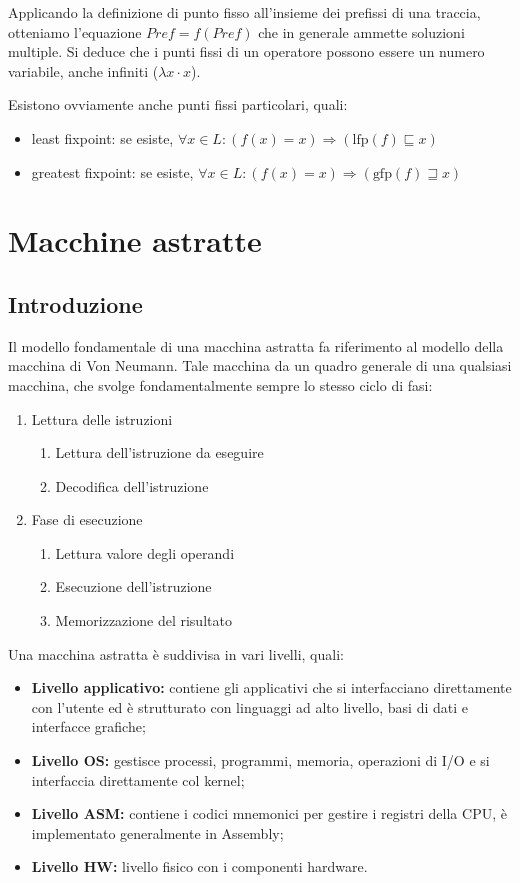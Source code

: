 \documentclass{article}[10pt]
\begin{document}
	Applicando la definizione di punto fisso all'insieme dei prefissi di una traccia, otteniamo l'equazione $Pref=f(Pref)$ che in generale ammette soluzioni multiple. Si deduce che i punti fissi di un operatore possono essere un numero variabile, anche infiniti ($\lambda x \cdot x$).
	
	Esistono ovviamente anche punti fissi particolari, quali:
	\begin{itemize}
		\item least fixpoint: se esiste, $\forall x \in L: (f(x)=x) \Rightarrow (\text{lfp}(f) \sqsubseteq x)$
		
		\item greatest fixpoint: se esiste, $\forall x \in L: (f(x)=x) \Rightarrow (\text{gfp}(f) \sqsupseteq x)$
	\end{itemize}
	

	\section{Macchine astratte}
	\subsection{Introduzione}
	Il modello fondamentale di una macchina astratta fa riferimento al modello della macchina di Von Neumann. Tale macchina da un quadro generale di una qualsiasi macchina, che svolge fondamentalmente sempre lo stesso ciclo di fasi:
	\begin{enumerate}
		\item Lettura delle istruzioni
		\begin{enumerate}
			\item Lettura dell'istruzione da eseguire
			\item Decodifica dell'istruzione
		\end{enumerate}
		\item Fase di esecuzione
		\begin{enumerate}
			\item Lettura valore degli operandi
			\item Esecuzione dell'istruzione
			\item Memorizzazione del risultato
		\end{enumerate}
	\end{enumerate}
	
	Una macchina astratta è suddivisa in vari livelli, quali:
	\begin{itemize}
		\item \textbf{Livello applicativo:} contiene gli applicativi che si interfacciano direttamente con l'utente ed è strutturato con linguaggi ad alto livello, basi di dati e interfacce grafiche;
		\item \textbf{Livello OS:} gestisce processi, programmi, memoria, operazioni di I/O e si interfaccia direttamente col kernel;
		\item \textbf{Livello ASM:} contiene i codici mnemonici per gestire i registri della CPU, è implementato generalmente in Assembly;
		\item \textbf{Livello HW:} livello fisico con i componenti hardware.
	\end{itemize}
	
\end{document}
